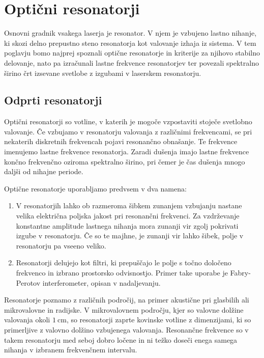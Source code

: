 
\chapter{Optični resonatorji}
Osnovni gradnik vsakega laserja je resonator. V njem je vzbujeno lastno nihanje,
ki skozi delno prepustno steno resonatorja kot valovanje izhaja iz sistema. V tem poglavju bomo 
najprej spoznali optične resonatorje in kriterije za njihovo stabilno delovanje,
nato pa izračunali lastne frekvence resonatorjev ter povezali spektralno širino črt
izsevane svetlobe z izgubami v laserskem resonatorju. 

\section{Odprti resonatorji}
Optični resonatorji so votline, v katerih je mogoče 
vzpostaviti stoječe svetlobno valovanje. Če vzbujamo v resonatorju valovanja z 
različnimi frekvencami, se pri nekaterih diskretnih frekvencah pojavi resonančno
obnašanje. Te frekvence imenujemo lastne frekvence
resonatorja. Zaradi dušenja imajo lastne frekvence končno frekvenčno oziroma spektralno 
širino, pri čemer je čas dušenja mnogo daljši od nihajne periode. 

Optične resonatorje uporabljamo predvsem v dva namena:
\begin{enumerate}
\item V resonatorjih lahko ob razmeroma šibkem zunanjem vzbujanju nastane velika
električna poljska jakost pri resonančni frekvenci. Za vzdrževanje
konstantne amplitude lastnega nihanja mora zunanji vir zgolj pokrivati izgube
v resonatorju. Če so te majhne, je zunanji vir lahko šibek, polje
v resonatorju pa vseeno veliko.\\
\item Resonatorji delujejo kot filtri, ki prepuščajo le polje s točno  
določeno frekvenco in izbrano prostorsko odvisnostjo. Primer take uporabe je 
Fabry-Perotov interferometer, opisan 
v nadaljevanju. 
\end{enumerate}

\begin{remark}
Resonatorje poznamo z različnih področij, na primer akustične pri glasbilih ali 
mikrovalovne in radijske. V mikrovalovnem področju, kjer so valovne dolžine valovanja
okoli $1~\si{\centi\metre}$, 
so resonatorji zaprte kovinske votline z dimenzijami, ki so primerljive z 
valovno dolžino vzbujenega valovanja. Resonančne frekvence so v takem resonatorju 
med seboj dobro ločene in ni težko doseči enega samega nihanja v izbranem 
frekvenčnem intervalu.
\end{remark}

